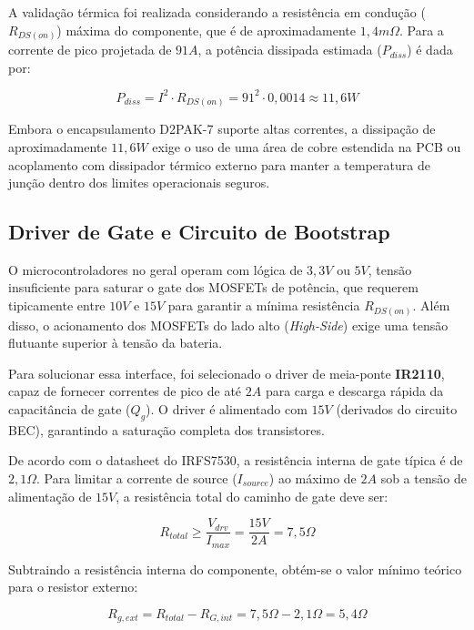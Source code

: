 \documentclass[12pt, a4paper, openright, oneside, brazilian]{abntex2}
\begin{document}
A validação térmica foi realizada considerando a resistência em condução ($R_{DS(on)}$) máxima do componente, que é de aproximadamente $1,4 m\Omega$. Para a corrente de pico projetada de $91A$, a potência dissipada estimada ($P_{diss}$) é dada por:

\begin{equation}
    P_{diss} = I^2 \cdot R_{DS(on)} = 91^2 \cdot 0,0014 \approx 11,6 W
\end{equation}

Embora o encapsulamento D2PAK-7 suporte altas correntes, a dissipação de aproximadamente $11,6W$ exige o uso de uma área de cobre estendida na PCB ou acoplamento com dissipador térmico externo para manter a temperatura de junção dentro dos limites operacionais seguros.



\subsection{Driver de Gate e Circuito de Bootstrap}
O microcontroladores no geral operam com lógica de $3,3V$ ou $5V$, tensão insuficiente para saturar o gate dos MOSFETs de potência, que requerem tipicamente entre $10V$ e $15V$ para garantir a mínima resistência $R_{DS(on)}$. Além disso, o acionamento dos MOSFETs do lado alto (\textit{High-Side}) exige uma tensão flutuante superior à tensão da bateria.

Para solucionar essa interface, foi selecionado o driver de meia-ponte \textbf{IR2110}, capaz de fornecer correntes de pico de até $2A$ para carga e descarga rápida da capacitância de gate ($Q_g$). O driver é alimentado com $15V$ (derivados do circuito BEC), garantindo a saturação completa dos transistores.

De acordo com o datasheet do IRFS7530, a resistência interna de gate típica é de $2,1 \Omega$. Para limitar a corrente de source ($I_{source}$) ao máximo de $2A$ sob a tensão de alimentação de $15V$, a resistência total do caminho de gate deve ser:

\begin{equation}
    R_{total} \geq \frac{V_{drv}}{I_{max}} = \frac{15V}{2A} = 7,5 \Omega
\end{equation}

Subtraindo a resistência interna do componente, obtém-se o valor mínimo teórico para o resistor externo:

\begin{equation}
    R_{g,ext} = R_{total} - R_{G,int} = 7,5 \Omega - 2,1 \Omega = 5,4 \Omega
\end{equation}
\end{document}
